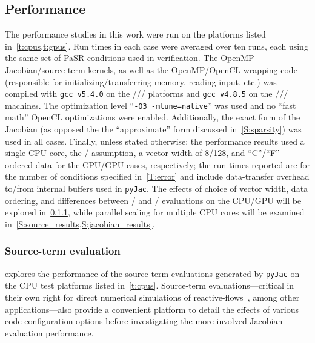 \documentclass[12pt,number,sort&compress,preprint]{elsarticle}
\begin{document}
\subsection{Performance}
\label{S:results}
The performance studies in this work were run on the platforms listed in~\cref{t:cpus,t:gpus}.
Run times in each case were averaged over ten runs, each using the same set of PaSR conditions used in verification.
The OpenMP Jacobian\slash source-term kernels, as well as the OpenMP\slash OpenCL wrapping code (responsible for initializing\slash transferring memory, reading input, etc.) was compiled with \texttt{gcc v5.4.0} on the \avx/\slash\gpunew/ platforms and \texttt{gcc v4.8.5} on the \sse/\slash\gpuold/ machines.
The optimization level ``\texttt{-O3 -mtune=native}'' was used and no ``fast math'' OpenCL optimizations were enabled.
Additionally, the exact form of the Jacobian (as opposed the the ``approximate'' form discussed in~\cref{S:sparsity}) was used in all cases.
Finally, unless stated otherwise: the performance results used a single CPU core, the \conp/ assumption, a vector width of \num{8}\slash\num{128}, and ``C''\slash ``F''-ordered data for the CPU\slash GPU cases, respectively; the run times reported are for the number of conditions specified in~\cref{T:error} and include data-transfer overhead to\slash from internal buffers used in \texttt{pyJac}.
The effects of choice of vector width, data ordering, and differences between \conp/ and \conv/ evaluations on the CPU\slash GPU will be explored in~\cref{S:source_results}, while parallel scaling for multiple CPU cores will be examined in~\cref{S:source_results,S:jacobian_results}.

\subsubsection{Source-term evaluation}
\label{S:source_results}

 explores the performance of the source-term evaluations generated by \texttt{pyJac} on the CPU test platforms listed in~\cref{t:cpus}.
Source-term evaluations---critical in their own right for direct numerical simulations of reactive-flows~\cite{Spafford:2010aa}, among other applications---also provide a convenient platform to detail the effects of various code configuration options before investigating the more involved Jacobian evaluation performance.
\end{document}
